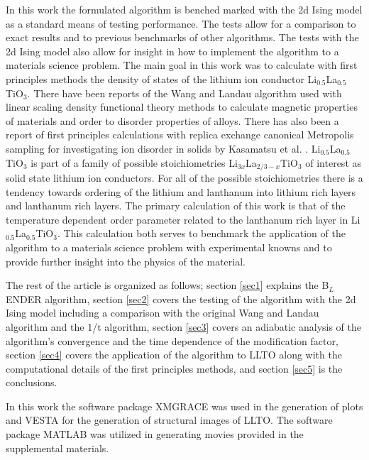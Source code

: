 \documentclass[aps,pre,reprint,superscriptaddress,showkeys]{revtex4-2}
\begin{document}
   In this work the formulated algorithm is benched marked with the 2d Ising model as a standard means of testing  performance.  The tests allow for a comparison to exact results and to previous benchmarks of other algorithms. The tests with the 2d Ising model also allow for insight in how to implement the algorithm to a materials science problem. The main goal in this work  was to calculate with first principles methods the  density of states of the lithium ion conductor Li$_{0.5}$La$_{0.5}$TiO$_3$. There  have been  reports of the Wang and Landau algorithm used with linear scaling density functional theory methods to calculate magnetic properties of materials and order to disorder properties of alloys\cite{Eisenbach, FP_Wang_Landau_CuZn}. There has also been a report of first principles calculations with replica exchange canonical Metropolis sampling for investigating ion disorder in solids by Kasamatsu et al. \cite{ion_disorder_replica}.  Li$_{0.5}$La$_{0.5}$TiO$_3$ is part of a family of possible stoichiometries Li$_{3x}$La$_{2/3 -x}$TiO$_3$ of interest as solid state lithium ion conductors\cite{domainboundaries, P4mmmstrucuture, imaginaryphonons, GENG2009555, peculiarities, LLTOreview, Li_La_ordering_computational}. For all of the possible stoichiometries there is a tendency towards ordering of the lithium and lanthanum into lithium rich layers and lanthanum rich layers.  The primary calculation of this work is that of the temperature dependent order parameter related to the lanthanum rich layer in Li$_{0.5}$La$_{0.5}$TiO$_3$. This calculation both serves to benchmark the application of the algorithm to a materials science problem with experimental knowns and to provide further insight into the physics of the material. 
   
   The rest of the article is organized as follows; section \ref{sec1} explains the B$_{L}$ENDER algorithm, section \ref{sec2} covers the testing of the algorithm with the 2d Ising model including a comparison with the original Wang and Landau algorithm and the 1/t algorithm, section \ref{sec3} covers an adiabatic analysis of the algorithm's convergence and the time dependence of the modification factor, section \ref{sec4} covers the application of the algorithm to LLTO along with the computational details of the first principles methods, and section \ref{sec5} is the conclusions. 
   
   In this work the software package XMGRACE\cite{XMGRACE} was used in the generation of plots and VESTA\cite{Vesta}  for the generation of structural images of LLTO. The software package  MATLAB was utilized in generating movies provided in the supplemental materials. 
\end{document}
